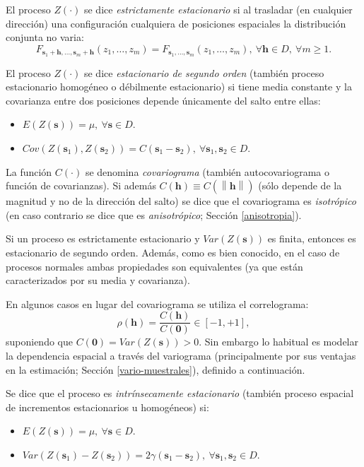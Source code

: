 \documentclass[
  spanish,
]{book}
\theoremstyle{break}
\theoremstyle{definition}
\theoremstyle{definition}
\theoremstyle{definition}
\theoremstyle{definition}
\theoremstyle{remark}
\begin{document}
El proceso \(Z(\cdot)\) se dice \emph{estrictamente estacionario} si al trasladar (en cualquier dirección) una configuración cualquiera de posiciones espaciales la distribución conjunta no varia:
\[F_{\mathbf{s}_1 +\mathbf{h}, \ldots,\mathbf{s}_m +\mathbf{h}}(z_1, \ldots, z_m) = F_{\mathbf{s}_1, \ldots, \mathbf{s}_m}(z_1, \ldots, z_m),\ \forall \mathbf{h}\in D,\ \forall m\geq 1.\]

El proceso \(Z(\cdot)\) se dice \emph{estacionario de segundo orden} (también proceso estacionario homogéneo o débilmente estacionario) si tiene media constante y la covarianza entre dos posiciones depende únicamente del salto entre ellas:

\begin{itemize}
\item
  \(E(Z(\mathbf{s}))=\mu,\ \forall \mathbf{s}\in D\).
\item
  \(Cov(Z(\mathbf{s}_1), Z(\mathbf{s}_2)) = C(\mathbf{s}_1 -\mathbf{s}_2),\ \forall \mathbf{s}_1 ,\mathbf{s}_2 \in D\).
\end{itemize}

La función \(C(\cdot)\) se denomina \emph{covariograma} (también autocovariograma o función de covarianzas).
Si además \(C(\mathbf{h}) \equiv C(\left\| \mathbf{h}\right\|)\) (sólo depende de la magnitud y no de la dirección del salto) se dice que el covariograma es \emph{isotrópico} (en caso contrario se dice que es \emph{anisotrópico}; Sección \ref{anisotropia}).

Si un proceso es estrictamente estacionario y \(Var(Z(\mathbf{s}))\) es finita, entonces es estacionario de segundo orden.
Además, como es bien conocido, en el caso de procesos normales ambas propiedades son equivalentes (ya que están caracterizados por su media y covarianza).

En algunos casos en lugar del covariograma se utiliza el correlograma:
\[\rho (\mathbf{h}) = \dfrac{C(\mathbf{h})}{C(\mathbf{0})} \in \left[-1,+1\right],\]
suponiendo que \(C(\mathbf{0}) = Var(Z(\mathbf{s})) >0\).
Sin embargo lo habitual es modelar la dependencia espacial a través del variograma (principalmente por sus ventajas en la estimación; Sección \ref{vario-muestrales}), definido a continuación.

Se dice que el proceso es \emph{intrínsecamente estacionario} (también proceso espacial de incrementos estacionarios u homogéneos) si:

\begin{itemize}
\item
  \(E(Z(\mathbf{s}))=\mu,\ \forall \mathbf{s}\in D\).
\item
  \(Var(Z(\mathbf{s}_1)-Z(\mathbf{s}_2)) = 2\gamma (\mathbf{s}_1 - \mathbf{s}_2),\ \forall \mathbf{s}_1 ,\mathbf{s}_2 \in D\).
\end{itemize}
\end{document}
